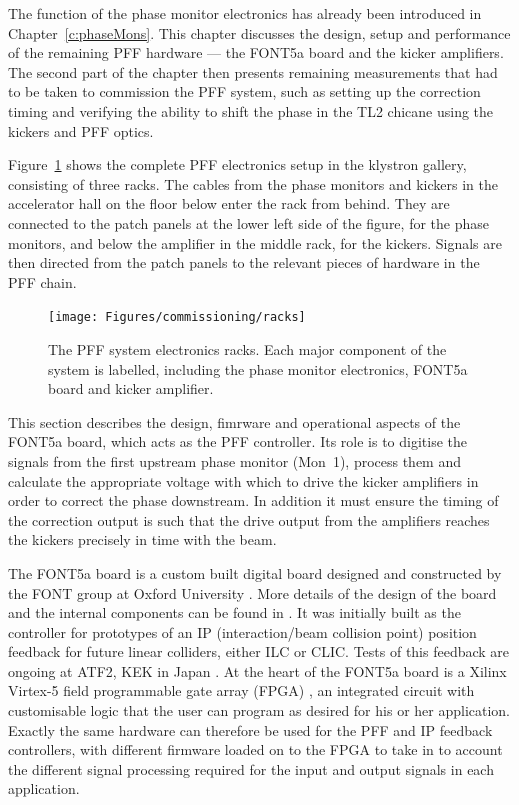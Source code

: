 
The function of the phase monitor electronics has already been introduced in Chapter~\ref{c:phaseMons}. This chapter discusses the design, setup and performance of the remaining PFF hardware --- the FONT5a board and the kicker amplifiers. The second part of the chapter then presents remaining measurements that had to be taken to commission the PFF system, such as setting up the correction timing and verifying the ability to shift the phase in the TL2 chicane using the kickers and PFF optics.

Figure~\ref{f:racks} shows the complete PFF electronics setup in the klystron gallery, consisting of three racks. The cables from the phase monitors and kickers in the accelerator hall on the floor below enter the rack from behind. They are connected to the patch panels at the lower left side of the figure, for the phase monitors, and below the amplifier in the middle rack, for the kickers. Signals are then directed from the patch panels to the relevant pieces of hardware in the PFF chain. 

\begin{figure}
  \centering
  \texttt{[image: Figures/commissioning/racks]}
  \caption{The PFF system electronics racks. Each major component of the system is labelled, including the phase monitor electronics, FONT5a board and kicker amplifier.}
  \label{f:racks}
\end{figure}


This section describes the design, fimrware and operational aspects of the FONT5a board, which acts as the PFF controller. Its role is to digitise the signals from the first upstream phase monitor (Mon~1), process them and calculate the appropriate voltage with which to drive the kicker amplifiers in order to correct the phase downstream. In addition it must ensure the timing of the correction output is such that the drive output from the amplifiers reaches the kickers precisely in time with the beam.

The FONT5a board is a custom built digital board designed and constructed by the FONT group at Oxford University \cite{fontGroup}. More details of the design of the board and the internal components can be found in \cite{dougThesis}. It was initially built as the controller for prototypes of an IP (interaction/beam collision point) position feedback for future linear colliders, either ILC or CLIC. Tests of this feedback are ongoing at ATF2, KEK in Japan  \cite{ipfbIPAC16}. At the heart of the FONT5a board is a Xilinx Virtex-5 field programmable gate array (FPGA) \cite{xilinx}, an integrated circuit with customisable logic that the user can program as desired for his or her application. Exactly the same hardware can therefore be used for the PFF and IP feedback controllers, with different firmware loaded on to the FPGA to take in to account the different signal processing required for the input and output signals in each application.

